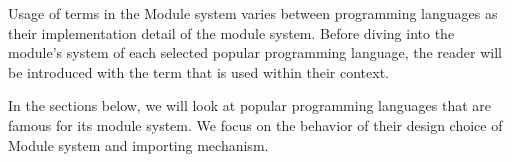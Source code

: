 Usage of terms in the Module system varies between programming languages as their implementation detail of the module system. Before diving into the module's system of each selected popular programming language, the reader will be introduced with the term that is used within their context.

In the sections below, we will look at popular programming languages that are famous for its module system. We focus on the behavior of their design choice of Module system and importing mechanism.



